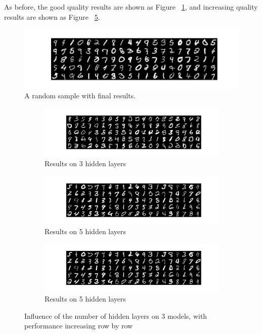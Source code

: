 \documentclass[12pt,letterpaper]{article}
\begin{document}
As before, the good quality results are shown as Figure ~\ref{fig:MNIST_VAE_hidden_results}, and increasing quality results are shown as Figure ~\ref{fig:MNIST_VAE_hidden}.
\begin{figure}[h]
    \centering
    \includegraphics[width=.6\linewidth]{VAE_MNIST_2_100_256results.png}
    \caption{\small A random sample with final results.}
    \label{fig:MNIST_VAE_hidden_results}
\end{figure}

\begin{figure}[h]
    \begin{subfigure}{0.49\textwidth}
    \includegraphics[width=\linewidth]{VAE_MNIST_0_100_256.png}
    \caption{\small Results on 3 hidden layers} \label{fig:a}
    \end{subfigure}\hspace*{\fill}
    \begin{subfigure}{0.49\textwidth}
    \includegraphics[width=\linewidth]{VAE_MNIST_2_100_256.png}
    \caption{\small Results on 5 hidden layers} \label{fig:b}
    \end{subfigure}
    \medskip
    \begin{subfigure}{0.49\textwidth}
    \includegraphics[width=\linewidth]{VAE_MNIST_2_100_256.png}
    \caption{\small Results on 5 hidden layers} \label{fig:c}
    \end{subfigure}
    \hspace*{\fill}
    \caption{Influence of the number of hidden layers on $3$ models, with performance increasing row by row} \label{fig:MNIST_VAE_hidden}
\end{figure}
\end{document}
